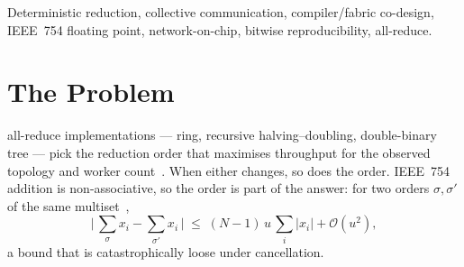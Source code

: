 \documentclass[journal,10pt]{IEEEtran}
\theoremstyle{plain}
\theoremstyle{definition}
\theoremstyle{remark}
\begin{document}
{\begin{abstract}
produced a root bit-identical to the canonical root; \InvNonSettling{} did not
settle, all but one a fabric watchdog fail-stop, and no run produced a finite
root differing from the canonical one. Injected faults establish oracle
non-vacuity on \MutOracleLo{}--\MutOracleHi{} of \MutTotal{} verdicts. Because
the compiler's search space cannot reach the bit result, we report what it can
reach: a portfolio of \SelConfigsRun{} of \SelConfigsTotal{} configurations
attains the measured optimum on \SelKFourOpt{} of \TournNInst{} held-out
instances and, refitted with an entire topology withheld, has mean
out-of-sample regret \SelUnseenTopoMean{} on the topology it never saw (95\%
bootstrap interval $[\SelUnseenTopoLo, \SelUnseenTopoHi]$) --- better than a
rule that conditions on topology and does see it in training
(\SelCondTopoMean{}). Finally we export the discipline to production
collectives in software (\emph{pinned-FBT}), correct the index-range
construction we published, and price the repair: bitwise reshape-invariant on
all \PinCells{} cells swept against a negative control that fires, at a
geometric mean of $\PinCostGeo\times$ stock \texttt{ncclAllReduce}
(provisional, the sweep having run under GPU contention).
\end{abstract}

\begin{IEEEkeywords}
Deterministic reduction, collective communication, compiler/fabric co-design,
IEEE~754 floating point, network-on-chip, bitwise reproducibility, all-reduce.
\end{IEEEkeywords}}

\maketitle
\IEEEdisplaynontitleabstractindextext
\IEEEpeerreviewmaketitle


\section{The Problem}\label{sec:intro}

 all-reduce implementations --- ring, recursive
halving--doubling, double-binary tree --- pick the reduction order that
maximises throughput for the observed topology and worker
count~\cite{rabenseifner2004optimization,nccl2018}. When either changes, so
does the order. IEEE~754 addition is non-associative, so the order is part of
the answer: for two orders $\sigma,\sigma'$ of the same
multiset~\cite{higham2002accuracy},
\begin{equation}
  \bigl|\,{\textstyle\sum_\sigma x_i} - {\textstyle\sum_{\sigma'} x_i}\,\bigr|
  \;\leq\; (N-1)\,u\,{\textstyle\sum_i} |x_i| + \mathcal{O}(u^2),
  \label{eq:higham}
\end{equation}
a bound that is catastrophically loose under cancellation.
\end{document}
